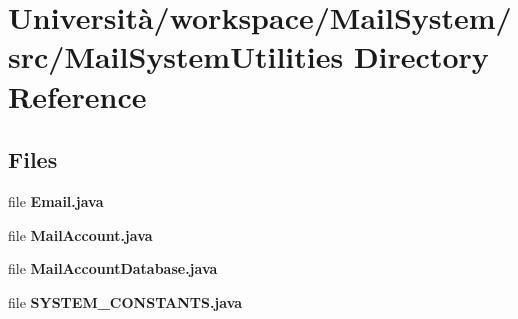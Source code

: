 \section{Università/workspace/\+Mail\+System/src/\+Mail\+System\+Utilities Directory Reference}
\label{dir_2fb8dc4ac8b5253e97470c7aeed8448a}
\subsection*{Files}
\begin{DoxyCompactItemize}
\item 
file \textbf{ Email.\+java}
\item 
file \textbf{ Mail\+Account.\+java}
\item 
file \textbf{ Mail\+Account\+Database.\+java}
\item 
file \textbf{ S\+Y\+S\+T\+E\+M\+\_\+\+C\+O\+N\+S\+T\+A\+N\+T\+S.\+java}
\end{DoxyCompactItemize}
